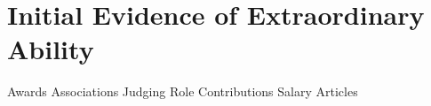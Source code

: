 \section{Initial Evidence of \mrls Extraordinary Ability}

{Awards}
{Associations}
{Judging}
{Role}
{Contributions}
{Salary}
{Articles}
